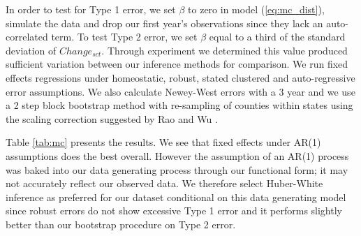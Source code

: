 \documentclass[12pt]{article}
\begin{document}
In order to test for Type 1 error, we set $\beta$ to zero in model (\ref{eq:mc_dist}), simulate the data and drop our first year's observations since they lack an auto-correlated term. To test Type 2 error, we set $\beta$ equal to a third of the standard deviation of $Change_{sct}$. Through experiment we determined this value produced sufficient variation between our inference methods for comparison. We run fixed effects regressions under homeostatic, robust, stated clustered and auto-regressive error assumptions. We also calculate Newey-West errors with a 3 year and we use a 2 step block bootstrap method with re-sampling of counties within states using the scaling correction suggested by Rao and Wu \cite{rao}. 

Table \ref{tab:mc} presents the results. We see that fixed effects under AR(1) assumptions does the best overall. However the assumption of an AR(1) process was baked into our data generating process through our functional form; it may not accurately reflect our observed data. We therefore select Huber-White inference as preferred for our dataset conditional on this data generating model since robust errors do not show excessive Type 1 error and it performs slightly better than our bootstrap procedure on Type 2 error.
\end{document}

